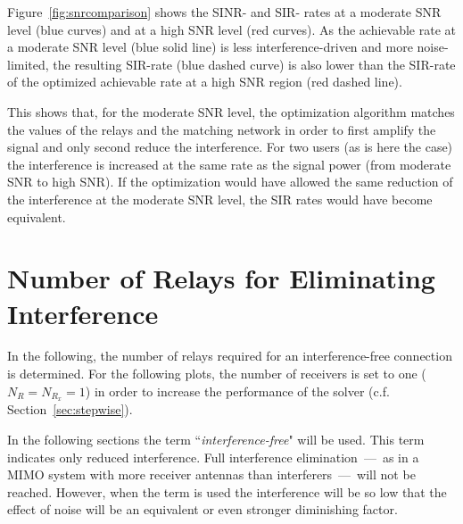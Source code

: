 Figure~\ref{fig:snrcomparison} shows the SINR- and SIR- rates at a moderate SNR level (blue curves) and at a high SNR level (red curves).
As the achievable rate at a moderate SNR level (blue solid line) is less interference-driven and more noise-limited, the resulting SIR-rate (blue dashed curve) is also lower than the SIR-rate of the optimized achievable rate at a high SNR region (red dashed line).

This shows that, for the moderate SNR level, the optimization algorithm matches the values of the relays and the matching network in order to first amplify the signal and only second reduce the interference.
For two users (as is here the case) the interference is increased at the same rate as the signal power (from moderate SNR to high SNR).
If the optimization would have allowed the same reduction of the interference at the moderate SNR level, the SIR rates would have become equivalent.

\section{Number of Relays for Eliminating Interference}
\label{sec:interf_fix}
In the following, the number of relays required for an interference-free connection is determined.
For the following plots, the number of receivers is set to one ($N_{R} = N_{R_x} = 1$) in order to increase the performance of the solver (c.f. Section~\ref{sec:stepwise}).

In the following sections the term ``\textit{interference-free}" will be used.
This term indicates only reduced interference.
Full interference elimination~---~as in a MIMO system with more receiver antennas than interferers~---~will not be reached.
However, when the term is used the interference will be so low that the effect of noise will be an equivalent or even stronger diminishing factor.


